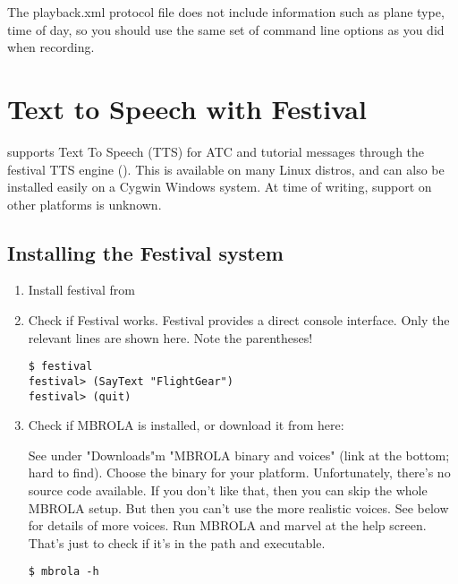 The playback.xml protocol file does not include information such as plane type,
time of day, so you should use the same set of command line options as you
did when recording.

\section{Text to Speech with Festival}

\FlightGear{} supports Text To Speech (TTS) for ATC and tutorial messages through the festival TTS
engine (). This is available on many Linux distros,
and can also be installed easily on a Cygwin
Windows system. At time of writing, support on other platforms is unknown.

\subsection{Installing the Festival system}

\begin{enumerate}
\item Install festival from 

\item Check if Festival works. Festival provides a direct console interface. Only the relevant lines are 
shown here. Note the parentheses!

\begin{verbatim}
$ festival
festival> (SayText "FlightGear")
festival> (quit)
\end{verbatim}

\item Check if MBROLA is installed, or download it from here: 


See under "Downloads"m "MBROLA binary and voices" 
(link at the bottom; hard to find). Choose the binary for your platform. Unfortunately, there's no 
source code available. If you don't like that, then you can skip the whole MBROLA setup. 
But then you can't use the more realistic voices. See below for details of more voices.
Run MBROLA and marvel at the help screen. That's just to check if it's in the path and executable.

\begin{verbatim}
$ mbrola -h
\end{verbatim}
\end{enumerate}

